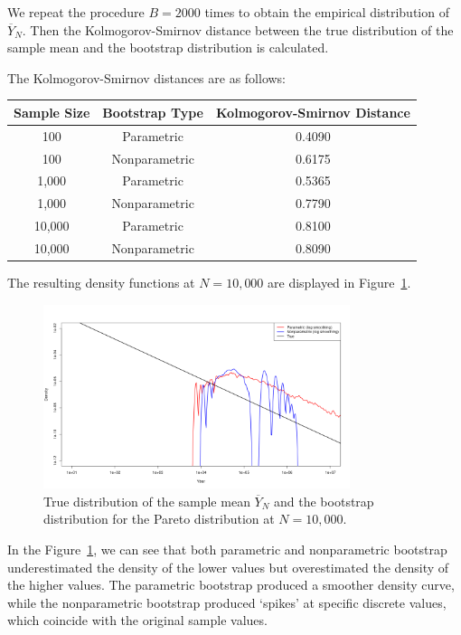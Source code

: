 \documentclass{article}
\begin{document}
We repeat the procedure \(B = 2000\) times to obtain the empirical distribution of \(\overline{Y}_N\). Then the Kolmogorov-Smirnov distance between the true distribution of the sample mean and the bootstrap distribution is calculated.

The Kolmogorov-Smirnov distances are as follows:

\begin{table}[h]
\centering
\begin{tabular}{|c|c|c|}
\hline
\textbf{Sample Size} & \textbf{Bootstrap Type} & \textbf{Kolmogorov-Smirnov Distance} \\ \hline
100 & Parametric & 0.4090 \\ \hline
100 & Nonparametric & 0.6175 \\ \hline
1,000 & Parametric & 0.5365 \\ \hline
1,000 & Nonparametric & 0.7790 \\ \hline
10,000 & Parametric & 0.8100 \\ \hline
10,000 & Nonparametric & 0.8090 \\ \hline
\end{tabular}
\end{table}

The resulting density functions at \(N = 10,000\) are displayed in Figure~\ref{fig:pareto_bootstrap}.

\begin{figure}[h]
\centering
\includegraphics[width=0.8\textwidth]{pareto_bootstrap_distributions.png}
\caption{True distribution of the sample mean \(\overline{Y}_N\) and the bootstrap distribution for the Pareto distribution at \(N = 10,000\).}
\label{fig:pareto_bootstrap}
\end{figure}

In the Figure~\ref{fig:pareto_bootstrap}, we can see that both parametric and nonparametric bootstrap underestimated the density of the lower values but overestimated the density of the higher values. The parametric bootstrap produced a smoother density curve, while the nonparametric bootstrap produced `spikes' at specific discrete values, which coincide with the original sample values.
\end{document}
